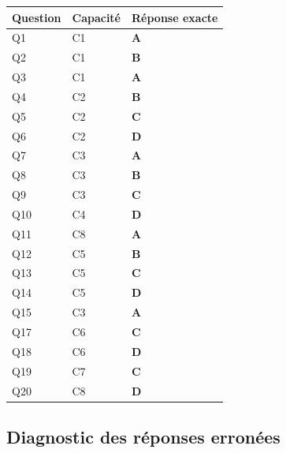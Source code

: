 \begin{center}
\begin{tabular}{lll}
\hline
Question & Capacité & Réponse exacte \\
\hline
Q1 & C1 & \textbf{A} \\
Q2 & C1 & \textbf{B} \\
Q3 & C1 & \textbf{A} \\
Q4 & C2 & \textbf{B} \\
Q5 & C2 & \textbf{C} \\
Q6 & C2 & \textbf{D} \\
Q7 & C3 & \textbf{A} \\
Q8 & C3 & \textbf{B} \\
Q9 & C3 & \textbf{C} \\
Q10 & C4 & \textbf{D} \\
Q11 & C8 & \textbf{A} \\
Q12 & C5 & \textbf{B} \\
Q13 & C5 & \textbf{C} \\
Q14 & C5 & \textbf{D} \\
Q15 & C3 & \textbf{A} \\
Q17 & C6 & \textbf{C} \\
Q18 & C6 & \textbf{D} \\
Q19 & C7 & \textbf{C} \\
Q20 & C8 & \textbf{D} \\
\hline
\end{tabular}
\end{center}

\subsection*{Diagnostic des réponses erronées}


